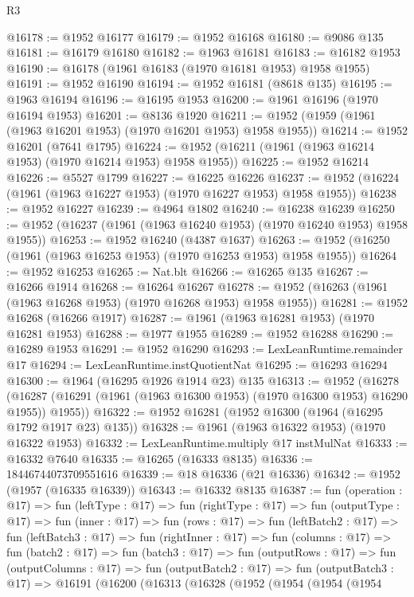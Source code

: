 \begin{lexlean}{R3}
\begin{coremodule}
@16178 := @1952 @16177
@16179 := @1952 @16168
@16180 := @9086 @135
@16181 := @16179 @16180
@16182 := @1963 @16181
@16183 := @16182 @1953
@16190 := @16178 (@1961 @16183 (@1970 @16181 @1953) @1958 @1955)
@16191 := @1952 @16190
@16194 := @1952 @16181 (@8618 @135)
@16195 := @1963 @16194
@16196 := @16195 @1953
@16200 := @1961 @16196 (@1970 @16194 @1953)
@16201 := @8136 @1920
@16211 := @1952 (@1959 (@1961 (@1963 @16201 @1953) (@1970 @16201 @1953) @1958 @1955))
@16214 := @1952 @16201 (@7641 @1795)
@16224 := @1952 (@16211 (@1961 (@1963 @16214 @1953) (@1970 @16214 @1953) @1958 @1955))
@16225 := @1952 @16214
@16226 := @5527 @1799
@16227 := @16225 @16226
@16237 := @1952 (@16224 (@1961 (@1963 @16227 @1953) (@1970 @16227 @1953) @1958 @1955))
@16238 := @1952 @16227
@16239 := @4964 @1802
@16240 := @16238 @16239
@16250 := @1952 (@16237 (@1961 (@1963 @16240 @1953) (@1970 @16240 @1953) @1958 @1955))
@16253 := @1952 @16240 (@4387 @1637)
@16263 := @1952 (@16250 (@1961 (@1963 @16253 @1953) (@1970 @16253 @1953) @1958 @1955))
@16264 := @1952 @16253
@16265 := Nat.blt
@16266 := @16265 @135
@16267 := @16266 @1914
@16268 := @16264 @16267
@16278 := @1952 (@16263 (@1961 (@1963 @16268 @1953) (@1970 @16268 @1953) @1958 @1955))
@16281 := @1952 @16268 (@16266 @1917)
@16287 := @1961 (@1963 @16281 @1953) (@1970 @16281 @1953)
@16288 := @1977 @1955
@16289 := @1952 @16288
@16290 := @16289 @1953
@16291 := @1952 @16290
@16293 := LexLeanRuntime.remainder @17
@16294 := LexLeanRuntime.instQuotientNat
@16295 := @16293 @16294
@16300 := @1964 (@16295 @1926 @1914 @23) @135
@16313 := @1952
    (@16278 (@16287 (@16291 (@1961 (@1963 @16300 @1953) (@1970 @16300 @1953) @16290 @1955)) @1955))
@16322 := @1952 @16281 (@1952 @16300 (@1964 (@16295 @1792 @1917 @23) @135))
@16328 := @1961 (@1963 @16322 @1953) (@1970 @16322 @1953)
@16332 := LexLeanRuntime.multiply @17 instMulNat
@16333 := @16332 @7640
@16335 := @16265 (@16333 @8135)
@16336 := 18446744073709551616
@16339 := @18 @16336 (@21 @16336)
@16342 := @1952 (@1957 (@16335 @16339))
@16343 := @16332 @8135
@16387 := fun (operation : @17) =>
  fun (leftType : @17) =>
  fun (rightType : @17) =>
  fun (outputType : @17) =>
  fun (inner : @17) =>
  fun (rows : @17) =>
  fun (leftBatch2 : @17) =>
  fun (leftBatch3 : @17) =>
  fun (rightInner : @17) =>
  fun (columns : @17) =>
  fun (batch2 : @17) =>
  fun (batch3 : @17) =>
  fun (outputRows : @17) =>
  fun (outputColumns : @17) =>
  fun (outputBatch2 : @17) =>
  fun (outputBatch3 : @17) =>
  @16191
    (@16200
      (@16313
        (@16328
          (@1952
            (@1954
              (@1954
                (@1954

\end{coremodule}
\end{lexlean}
